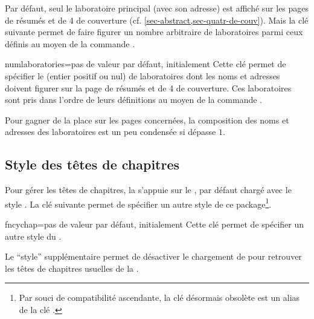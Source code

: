 Par défaut, seul le laboratoire principal (avec son adresse) est affiché sur les
pages de résumés et de 4\ieme{} de couverture (cf. \vref{sec-abstract,sec-quatr-de-couv}). Mais la clé
 suivante permet de faire figurer un nombre arbitraire
de laboratoires parmi ceux définis au moyen de la commande .%
%
%

\begin{docKey}{numlaboratories}{=}{pas de valeur par
    défaut, initialement }
  Cette clé permet de spécifier le  (entier positif ou nul) de
  laboratoires dont les noms et adresses doivent figurer sur la page de résumés
  et de 4\ieme{} de couverture. Ces laboratoires sont pris dans l'ordre de
  leurs définitions au moyen de la commande .
\end{docKey}

Pour gagner de la place sur les pages concernées, la composition des noms et
adresses des laboratoires est un peu condensée si  dépasse $1$.

\subsection{Style des têtes de chapitres}\label{sec-style-des-tetes}

Pour gérer les têtes de chapitres, la \yatCl{} s'appuie sur le
, par défaut chargé avec le style . La
clé  suivante permet de spécifier un autre style de ce
package\footnote{Par souci de compatibilité ascendante, la clé désormais
  obsolète  est un alias de la clé
  .}.%
%
{%
  \begin{docKey}{fncychap}{=\textbar{}\textbar{}\textbar{}\textbar{}\textbar{}\textbar{}\textbar{}\textbar{}}{pas
      de valeur par défaut, initialement }
    Cette clé permet de spécifier un autre style du .

    Le \enquote{style} supplémentaire  permet de désactiver le
    chargement de  pour retrouver les têtes de chapitres
    usuelles de la .
  \end{docKey}
}

